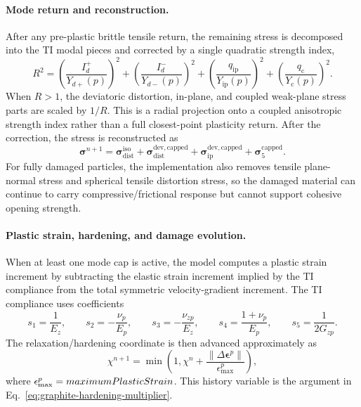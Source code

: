 \paragraph{Mode return and reconstruction.}
After any pre-plastic brittle tensile return, the remaining stress is decomposed into the TI modal pieces and corrected by a single quadratic strength index,
\begin{equation}
  R^2 =
  \left(\frac{I_d^+}{Y_{d+}(p)}\right)^2+
  \left(\frac{I_d^-}{Y_{d-}(p)}\right)^2+
  \left(\frac{q_{\mathrm{ip}}}{Y_{\mathrm{ip}}(p)}\right)^2+
  \left(\frac{q_{\mathrm{c}}}{Y_{\mathrm{c}}(p)}\right)^2 .
  \label{eq:graphite-quadratic-ti-yield}
\end{equation}
When \(R>1\), the deviatoric distortion, in-plane, and coupled weak-plane stress parts are scaled by \(1/R\).  This is a radial projection onto a coupled anisotropic strength index rather than a full closest-point plasticity return.  After the correction, the stress is reconstructed as
\begin{equation}
  \boldsymbol{\sigma}^{n+1} =
  \boldsymbol{\sigma}_{\mathrm{dist}}^{\mathrm{iso}}
  + \boldsymbol{\sigma}_{\mathrm{dist}}^{\mathrm{dev,capped}}
  + \boldsymbol{\sigma}_{\mathrm{ip}}^{\mathrm{dev,capped}}
  + \boldsymbol{\sigma}_{5}^{\mathrm{capped}}.
  \label{eq:graphite-stress-reconstruction}
\end{equation}
For fully damaged particles, the implementation also removes tensile plane-normal stress and spherical tensile distortion stress, so the damaged material can continue to carry compressive/frictional response but cannot support cohesive opening strength.

\paragraph{Plastic strain, hardening, and damage evolution.}
When at least one mode cap is active, the model computes a plastic strain increment by subtracting the elastic strain increment implied by the TI compliance from the total symmetric velocity-gradient increment.  The TI compliance uses coefficients
\begin{equation}
  s_1=\frac{1}{E_z},\qquad
  s_2=-\frac{\nu_p}{E_p},
  \qquad
  s_3=-\frac{\nu_{zp}}{E_z},
  \qquad
  s_4=\frac{1+\nu_p}{E_p},
  \qquad
  s_5=\frac{1}{2G_{zp}}.
  \label{eq:graphite-compliance-coefficients}
\end{equation}
The relaxation/hardening coordinate is then advanced approximately as
\begin{equation}
  \chi^{n+1}=\min\left(1,\chi^n+\frac{\|\Delta\boldsymbol{\epsilon}^p\|}{\epsilon^p_{\max}}\right),
  \label{eq:graphite-relaxation-update}
\end{equation}
where \(\epsilon^p_{\max}=maximumPlasticStrain\).  This history variable is the argument in Eq.~\eqref{eq:graphite-hardening-multiplier}.


